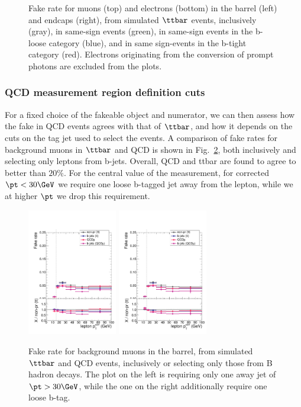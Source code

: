 \begin{figure}[htb]
	\caption{Fake rate for muons (top) and electrons (bottom) in the barrel (left) and endcaps (right), from simulated $\ttbar$ events, inclusively (gray), in same-sign events (green), in same-sign events in the b-loose category (blue), and in same sign-events in the b-tight category (red). Electrons originating from the conversion of prompt photons are excluded from the plots.}
	\label{fig:frmeas-closure-ttvars}
\end{figure}


\subsubsection{QCD measurement region definition cuts}
For a fixed choice of the fakeable object and numerator, we can then assess how the fake in QCD events agrees with that of $\ttbar$, and how it depends on the cuts on the tag jet used to select the events.
A comparison of fake rates for background muons in $\ttbar$ and QCD is shown in Fig.~\ref{fig:frmeas-closure-bnb-mu}, both inclusively and selecting only leptons from b-jets. Overall, QCD and ttbar are found to agree to better than $20\%$.  For the central value of the measurement, for corrected $\pt < 30 \GeV$ we require one loose b-tagged jet away from the lepton, while we at higher $\pt$ we drop this requirement.
\begin{figure}[htb]
	\centering 
\includegraphics[width=0.35\textwidth]{plots_fakerate/measurement/mu_bnb_barrel}
\includegraphics[width=0.35\textwidth]{plots_fakerate/measurement/mu_bnb_barrel_oneLoose}
	\caption{Fake rate for background muons in the barrel, from simulated $\ttbar$ and QCD events, inclusively or selecting only those from B hadron decays. The plot on the left is requiring only one away jet of $\pt > 30\GeV$, while the one on the right additionally require one loose b-tag.}
	\label{fig:frmeas-closure-bnb-mu}
\end{figure}

